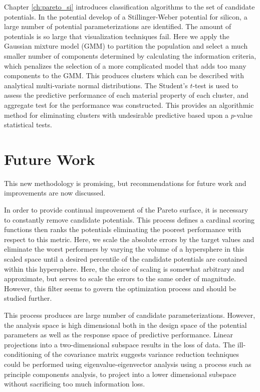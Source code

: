 Chapter \ref{ch:pareto_si} introduces classification algorithms to the set of candidate potentials.  In the potential develop of a Stillinger-Weber potential for silicon, a large number of potential parameterizations are identified.  The amount of potentials is so large that visualization techniques fail.  Here we apply the Gaussian mixture model (GMM) to partition the population and select a much smaller number of components determined by calculating the information criteria, which penalizes the selection of a more complicated model that adds too many components to the GMM.  This produces clusters which can be described with analytical multi-variate normal distributions.  The Student's $t$-test is used to assess the predictive performance of each material property of each cluster, and aggregate test for the performance was constructed.  This provides an algorithmic method for eliminating clusters with undesirable predictive based upon a $p$-value statistical tests.

\section{Future Work}

This new methodology is promising, but recommendations for future work and improvements are now discussed.

In order to provide continual improvement of the Pareto surface, it is necessary to constantly remove candidate potentials.  This process defines a cardinal scoring functions then ranks the potentials eliminating the poorest performance with respect to this metric.  Here, we scale the absolute errors by the target values and eliminate the worst performers by varying the volume of a hypersphere in this scaled space until a desired percentile of the candidate potentials are contained within this hypersphere.  Here, the choice of scaling is somewhat arbitrary and approximate, but serves to scale the errors to the same order of magnitude.  However, this filter seems to govern the optimization process and should be studied further.

This process produces are large number of candidate parameterizations.  However, the analysis space is high dimensional both in the design space of the potential parameters as well as the response space of predictive performance.  Linear projections into a two-dimensional subspace results in the loss of data.  The ill-conditioning of the covariance matrix suggests variance reduction techniques could be performed using eigenvalue-eigenvector analysis using a process such as principle components analysis, to project into a lower dimensional subspace without sacrificing too much information loss.

